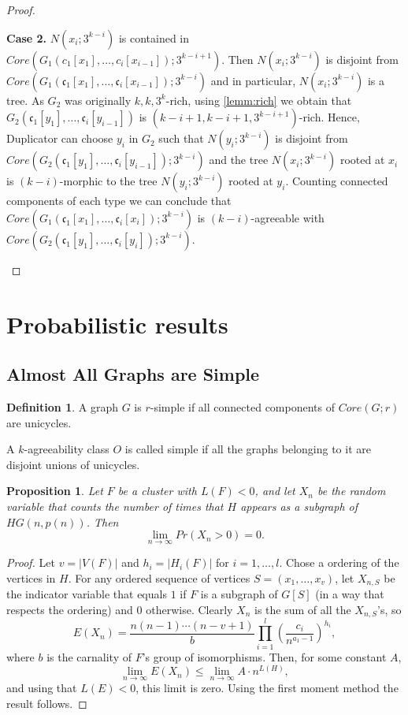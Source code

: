 \documentclass[11pt,notitlepage]{report}
\newtheorem{proposition}{Proposition}[chapter]
\theoremstyle{definition}
\newtheorem{definition}{Definition}[chapter]
\newcommand{\cc}{\mathfrak{c}}
\newcommand{\Ln}{\lim\limits_{n\to \infty}}
\begin{document}
\begin{proof}
\begin{itemize}[leftmargin=*]
		\textbf{Case 2.} $N(x_i;3^{k-i})$ is contained in 
			$Core(G_1(c_1[x_1],\dots,c_i[x_{i-1}]);3^{k-i+1})$. Then
			$N(x_i;3^{k-i})$ is disjoint from $Core(G_1(\cc_1[x_1],\dots,\cc_i[x_{i-1}]);3^{k-i})$
			and in particular, $N(x_i;3^{k-i})$ is a tree. As $G_2$
			was originally $k,k,3^k$-rich, using \cref{lemm:rich} we obtain
			that $G_2(\cc_1[y_1],\dots,\cc_i[y_{i-1}])$ is
			$(k-i+1,k-i+1,3^{k-i+1})$-rich. Hence,
			Duplicator can choose $y_i$ in $G_2$ such that $N(y_i;3^{k-i})$ is disjoint from \\
			$Core(G_2(\cc_1[y_1],\dots,\cc_i[y_{i-1}]);3^{k-i})$ and the tree $N(x_i;3^{k-i})$
			rooted at $x_i$ is $(k-i)$-morphic to the tree $N(y_i;3^{k-i})$ rooted at $y_i$.
			Counting connected components of each type we can conclude that
			$Core(G_1(\cc_1[x_1],\dots,\cc_i[x_i]);3^{k-i})$
			is $(k-i)$-agreeable with  $Core(G_2(\cc_1[y_1],\dots,\cc_i[y_i]);3^{k-i})$.
		  	\end{itemize}
\end{proof}

\section{Probabilistic results}


\subsection{Almost All Graphs are Simple}

\begin{definition} 
	A graph $G$ is $r$-simple if all connected components of $Core(G;r)$
	are unicycles. 
\end{definition}

A $k$-agreeability class $O$ is called simple if all the graphs
belonging to it are disjoint unions of unicycles.
 

\begin{proposition}\label{prop:supercritical}
	Let $F$ be a cluster with $L(F)<0$, and let $X_n$ be the
	random variable that counts the number of times that $H$ appears
	as a subgraph of $HG(n,p(n))$. Then
	\[\Ln Pr(X_n>0)=0. \]
\end{proposition}
\begin{proof}
	Let $v=|V(F)|$ and $h_i=|H_i(F)|$ for $i=1,\dots, l$. 
	Chose a ordering of the vertices in $H$. 
	For any ordered sequence of vertices $S=(x_1, \dots, x_v)$, 
	let $X_{n,S}$ be the indicator variable that equals $1$ if $F$
	is a subgraph of $G[S]$ (in a way that respects the ordering) and
	$0$ otherwise. Clearly $X_n$ is the sum of all the $X_{n,S}$'s, so
	\[ E(X_n)= \frac{n(n-1)\cdots (n-v+1)}{b} \prod_{i=1}^{l}
	\left( \frac{c_i}{n^{a_1-1}}\right)^{h_i}, \] 
	where $b$ is the carnality of $F$'s group of isomorphisms. 
	Then, for some constant $A$,
	\[ \Ln E(X_n)\leq \Ln A\cdot n^{L(H)}, \]
	and using that $L(E)<0$, this limit is zero.
	Using the first moment method the result follows. 
\end{proof}
\end{document}
